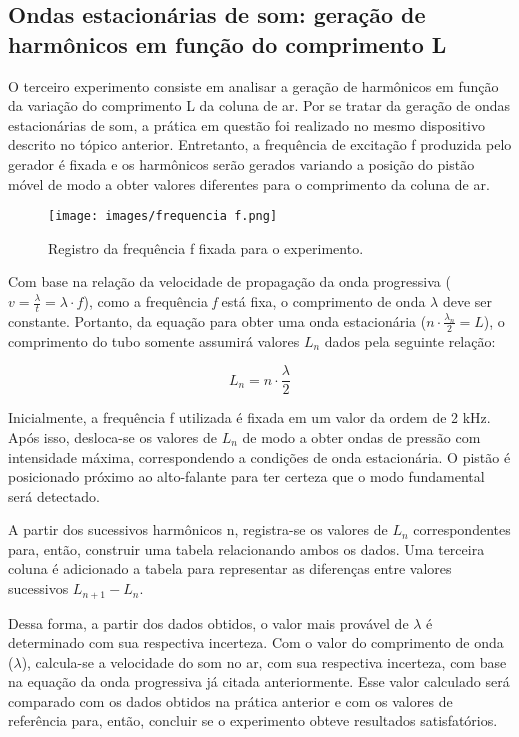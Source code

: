 \subsection{Ondas estacionárias de som: geração de harmônicos em
função do comprimento L}

O terceiro experimento consiste em analisar a geração de harmônicos em função da variação do comprimento L da coluna de ar. Por se tratar da geração de ondas estacionárias de som, a prática em questão foi realizado no mesmo dispositivo descrito no tópico anterior. Entretanto, a frequência de excitação f produzida pelo gerador é fixada e os harmônicos serão gerados variando a posição do pistão móvel de modo a obter valores diferentes para o comprimento da coluna de ar.

\begin{figure}[H]
  \centering
  \texttt{[image: images/frequencia f.png]}
  \caption{ Registro da frequência f fixada para o experimento.}
\end{figure}

Com base na relação da velocidade de propagação da onda progressiva ($v = \frac{\lambda}{t} = \lambda \cdot f$), como a frequência \textit{f} está fixa, o comprimento de onda $\lambda$ deve ser constante. Portanto, da equação para obter uma onda estacionária ($n \cdot \frac{\lambda_n}{2} = L$), o comprimento do tubo somente assumirá valores $L_n$ dados pela seguinte relação:

\[ L_n = n \cdot \frac{\lambda}{2}\]

Inicialmente, a frequência f utilizada é fixada em um valor da ordem de 2 kHz. Após isso, desloca-se os valores de $L_n$ de modo a obter ondas de pressão com intensidade máxima, correspondendo a condições de onda estacionária. O pistão é posicionado próximo ao alto-falante para ter certeza que o modo fundamental será detectado.

A partir dos sucessivos harmônicos n, registra-se os valores de $L_n$ correspondentes para, então, construir uma tabela relacionando ambos os dados. Uma terceira coluna é adicionado a tabela para representar as diferenças entre valores sucessivos $L_{n+1}-L_n$.

Dessa forma, a partir dos dados obtidos, o valor mais provável de $\lambda$ é determinado com sua respectiva incerteza. Com o valor do comprimento de onda ($\lambda$), calcula-se a velocidade do som no ar, com sua respectiva incerteza, com base na equação da onda progressiva já citada anteriormente. Esse valor calculado será comparado com os dados obtidos na prática anterior e com os valores de referência para, então, concluir se o experimento obteve resultados satisfatórios.
